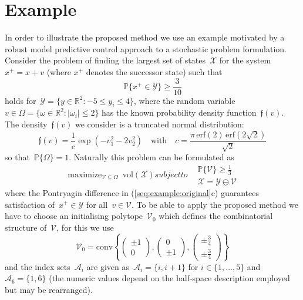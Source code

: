 \documentclass[letterpaper, 10pt, conference]{ieeeconf} %
\providecommand{\abs}[1]{\left\lvert#1\right\rvert}
\providecommand{\conv}{\text{conv}}
\DeclareMathOperator*{\maximize}{maximize}
\begin{document}
\section{Example}\label{sec:example}
%
%
\noindent In order to illustrate the proposed method we use an example motivated by a robust model predictive control approach to a stochastic problem formulation.
%
Consider the problem of finding the largest set of states~$\mathcal X$ for the system~$x^+=x+v$ (where $x^+$ denotes the successor state) such that
\[
\mathbb P\{x^+\in\mathcal Y\}\geq \frac{3}{10}
\]
holds for~$\mathcal Y = \{y\in\mathbb R^2:-5\leq y_i\leq 4\}$, where the random variable~$v\in\Omega=\{\omega\in\mathbb R^2:\abs{\omega_i}\leq2\}$ has the known probability density function~$\mathfrak f(v)$.
%
The density~$\mathfrak f(v)$ we consider is a truncated normal distribution:
\[
\mathfrak f(v) = \frac{1}{c}\exp(-v_1^2-2v_2^2)
\quad \text{with} \quad
c=\frac{\pi\,\text{erf}(2)\,\text{erf}(2\sqrt{2})}{\sqrt 2}
\]
so that~$\mathbb P\{\Omega\}=1$.
%
Naturally this problem can be formulated as
%
\begin{subequations}\label{seq:example:original}
\begin{equation}
	\maximize_{\mathcal V \subseteq\Omega} \ \text{vol}(\mathcal X)
\end{equation}
subject to
\begin{align}
	&\mathbb P\{\mathcal V\}\geq \frac{1}{3} \\
	&\mathcal X = \mathcal Y\ominus \mathcal V
\end{align}
\end{subequations}
%
where the Pontryagin difference in (\ref{seq:example:original}c) guarantees satisfaction of~$x^+\in\mathcal Y$ for all~$v\in\mathcal V$.
%
To be able to apply the proposed method we have to choose an initialising polytope~$\mathcal V_0$ which defines the combinatorial structure of~$\mathcal V$, for this we use 
%
\[
\mathcal V_0 = \conv\left\{\begin{pmatrix}\pm 1\\0 \end{pmatrix},\begin{pmatrix}0\\\pm1\end{pmatrix},\begin{pmatrix}\pm\frac{3}{4}\\\pm\frac{3}{4}\end{pmatrix}\right\}
\]
%
and the index sets~$\mathcal A_i$ are given as~$\mathcal A_i=\{i,i+1\}$ for $i\in\{1,\dots,5\}$ and~$\mathcal A_6=\{1,6\}$ (the numeric values depend on the half-space description employed but may be rearranged).
%
\end{document}
